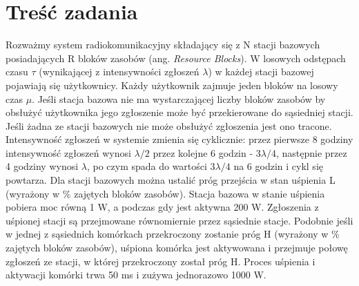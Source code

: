 \section{Treść zadania}
Rozważmy system radiokomunikacyjny składający się z N stacji bazowych posiadających R bloków zasobów (ang. \emph{Resource Blocks}). W losowych odstępach czasu $\tau$ (wynikającej z intensywności zgłoszeń $\lambda$) w każdej stacji bazowej pojawiają się użytkownicy. Każdy użytkownik zajmuje jeden bloków na losowy czas $\mu$. Jeśli stacja bazowa nie ma wystarczającej liczby bloków zasobów by obsłużyć użytkownika jego zgłoszenie może być przekierowane do sąsiedniej stacji. Jeśli żadna ze stacji bazowych nie może obsłużyć zgłoszenia jest ono tracone. Intensywność zgłoszeń w systemie zmienia się cyklicznie: przez pierwsze 8 godziny intensywność zgłoszeń wynosi $\lambda / 2$ przez kolejne 6 godzin - $3\lambda / 4$, następnie przez 4 godziny wynosi $\lambda$, po czym spada do wartości $3\lambda / 4$ na 6 godzin i cykl się powtarza. Dla stacji bazowych można ustalić próg przejścia w stan uśpienia L (wyrażony w \% zajętych bloków zasobów). Stacja bazowa w stanie uśpienia pobiera moc równą 1 W, a podczas gdy jest aktywna 200 W. Zgłoszenia z uśpionej stacji są przejmowane równomiernie przez sąsiednie stacje. Podobnie jeśli w jednej z sąsiednich komórkach przekroczony zostanie próg H (wyrażony w \% zajętych bloków zasobów), uśpiona komórka jest aktywowana i przejmuje połowę zgłoszeń ze stacji, w której przekroczony został próg H. Proces uśpienia i aktywacji komórki trwa 50 ms i zużywa jednorazowo 1000 W.